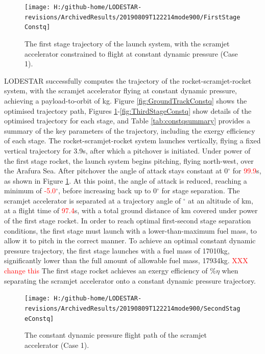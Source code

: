 \begin{figure}[ht!] %
	\centering
	\texttt{[image: H:/github-home/LODESTAR-revisions/ArchivedResults/20190809T122214mode900/FirstStageConstq]}
	\caption{The first stage trajectory of the launch system, with the scramjet accelerator constrained to flight at constant dynamic pressure (Case 1).}
	\label{fig:FirstStageConstq}
\end{figure}
LODESTAR successfully computes the trajectory of the rocket-scramjet-rocket system, with the scramjet accelerator flying at constant dynamic pressure, achieving a payload-to-orbit of \PayloadToOrbitConstqNoReturn kg.
Figure \ref{fig:GroundTrackConstq} shows the optimised trajectory path, Figures \ref{fig:FirstStageConstq}-\ref{fig:ThirdStageConstq} show details of the optimised trajectory for each stage, and Table \ref{tab:constqsummary} provides a summary of the key parameters of the trajectory, including the exergy efficiency of each stage.
The rocket-scramjet-rocket system launches vertically, flying a fixed vertical trajectory for 3.9s, after which a pitchover is initiated. Under power of the first stage rocket, the launch system begins pitching, flying north-west, over the Arafura Sea. 
After pitchover the angle of attack stays constant at 0$^\circ$ for \textcolor{red}{99.9}s, as shown in Figure \ref{fig:FirstStageConstq}. At this point, the angle of attack is reduced, reaching a minimum of \textcolor{red}{-5.0}$^\circ$, before increasing back up to 0$^\circ$ for stage separation. 
The scramjet accelerator is separated at a trajectory angle of \firstsecondSeparationgammaConstqNoReturn$^\circ$ at an altitude of \firstsecondSeparationAltConstqNoReturn km, at a flight time of \textcolor{red}{97.4}s, with a total ground distance of \FirstStageDistStandardNoReturn km covered under power of the first stage rocket. 
 In order to reach optimal first-second stage separation conditions, the first stage must launch with a lower-than-maximum fuel mass, to allow it to pitch in the correct manner. To achieve an optimal constant dynamic pressure trajectory, the first stage launches with a fuel mass of 17010kg, significantly lower than the full amount of allowable fuel mass, 17934kg. 
 \textcolor{red}{XXX change this}
The first stage rocket achieves an exergy efficiency of \firstExergyEffConstqNoReturn\%$\eta$ when separating the scramjet accelerator onto a constant dynamic pressure trajectory. 


\begin{figure}[ht!]%
\centering
\texttt{[image: H:/github-home/LODESTAR-revisions/ArchivedResults/20190809T122214mode900/SecondStageConstq]}
\caption{The constant dynamic pressure flight path of the scramjet accelerator (Case 1).}
\label{fig:SecondStageConstq}
\end{figure}


